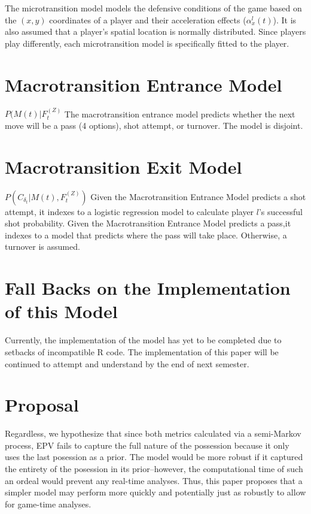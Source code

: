 \documentclass[12pt,twoside]{dukestatscithesis}
\theoremstyle{definition}
\theoremstyle{definition}
\theoremstyle{definition}
\theoremstyle{remark}
\begin{document}
The microtransition model models the defensive conditions of the game
based on the \((x,y)\) coordinates of a player and their acceleration
effects (\(\alpha^{l}_{x}(t)\)). It is also assumed that a player's
spatial location is normally distributed. Since players play
differently, each microtransition model is specifically fitted to the
player.

\section{Macrotransition Entrance
Model}\label{macrotransition-entrance-model}

\(P(M(t)|F_{t}^{(Z)}\) The macrotransition entrance model predicts
whether the next move will be a pass (4 options), shot attempt, or
turnover. The model is disjoint.

\section{Macrotransition Exit Model}\label{macrotransition-exit-model}

\(P(C_{\delta_{t}}|M(t), F_{t}^{(Z)})\) Given the Macrotransition
Entrance Model predicts a shot attempt, it indexes to a logistic
regression model to calculate player \(l\)'s successful shot
probability. Given the Macrotransition Entrance Model predicts a pass,it
indexes to a model that predicts where the pass will take place.
Otherwise, a turnover is assumed.

\section{Fall Backs on the Implementation of this
Model}\label{fall-backs-on-the-implementation-of-this-model}

Currently, the implementation of the model has yet to be completed due
to setbacks of incompatible R code. The implementation of this paper
will be continued to attempt and understand by the end of next semester.

\section{Proposal}\label{proposal}

Regardless, we hypothesize that since both metrics calculated via a
semi-Markov process, EPV fails to capture the full nature of the
possession because it only uses the last posession as a prior. The model
would be more robust if it captured the entirety of the posession in its
prior--however, the computational time of such an ordeal would prevent
any real-time analyses. Thus, this paper proposes that a simpler model
may perform more quickly and potentially just as robustly to allow for
game-time analyses.
\end{document}
